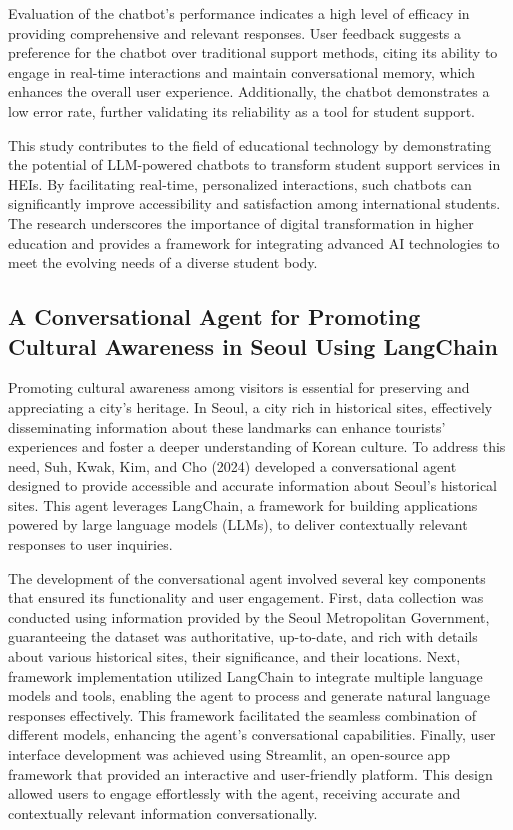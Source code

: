 Evaluation of the chatbot's performance indicates a high level of efficacy in providing comprehensive and relevant responses. User feedback suggests a preference for the chatbot over traditional support methods, citing its ability to engage in real-time interactions and maintain conversational memory, which enhances the overall user experience. Additionally, the chatbot demonstrates a low error rate, further validating its reliability as a tool for student support.

This study contributes to the field of educational technology by demonstrating the potential of LLM-powered chatbots to transform student support services in HEIs. By facilitating real-time, personalized interactions, such chatbots can significantly improve accessibility and satisfaction among international students. The research underscores the importance of digital transformation in higher education and provides a framework for integrating advanced AI technologies to meet the evolving needs of a diverse student body.

\subsection{A Conversational Agent for Promoting Cultural Awareness in Seoul Using LangChain}

Promoting cultural awareness among visitors is essential for preserving and appreciating a city's heritage. In Seoul, a city rich in historical sites, effectively disseminating information about these landmarks can enhance tourists' experiences and foster a deeper understanding of Korean culture. To address this need, Suh, Kwak, Kim, and Cho (2024) developed a conversational agent designed to provide accessible and accurate information about Seoul's historical sites. This agent leverages LangChain, a framework for building applications powered by large language models (LLMs), to deliver contextually relevant responses to user inquiries.

The development of the conversational agent involved several key components that ensured its functionality and user engagement. First, data collection was conducted using information provided by the Seoul Metropolitan Government, guaranteeing the dataset was authoritative, up-to-date, and rich with details about various historical sites, their significance, and their locations. Next, framework implementation utilized LangChain to integrate multiple language models and tools, enabling the agent to process and generate natural language responses effectively. This framework facilitated the seamless combination of different models, enhancing the agent's conversational capabilities. Finally, user interface development was achieved using Streamlit, an open-source app framework that provided an interactive and user-friendly platform. This design allowed users to engage effortlessly with the agent, receiving accurate and contextually relevant information conversationally.

